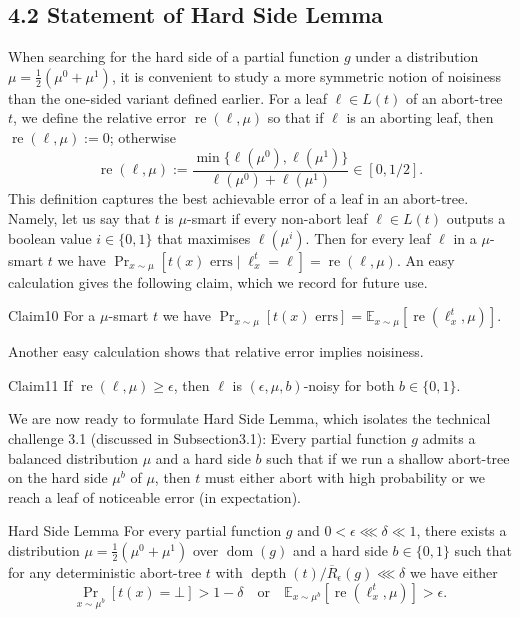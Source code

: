 \subsection*{4.2 Statement of Hard Side Lemma}
When searching for the hard side of a partial function $g$ under a distribution $\mu=\frac12(\mu^0+\mu^1)$, it is convenient to study a more symmetric notion of noisiness than the one-sided variant defined earlier. For a leaf $\ell\in L(t)$ of an abort-tree $t$, we define the relative error $\operatorname{re}(\ell,\mu)$ so that if $\ell$ is an aborting leaf, then $\operatorname{re}(\ell,\mu):=0$; otherwise
\[\operatorname{re}(\ell,\mu):=\frac{\min\{\ell(\mu^0),\ell(\mu^1)\}}{\ell(\mu^0)+\ell(\mu^1)}\in[0,1/2].\]
This definition captures the best achievable error of a leaf in an abort-tree. Namely, let us say that $t$ is $\mu$-smart if every non-abort leaf $\ell\in L(t)$ outputs a boolean value $i\in\{0,1\}$ that maximises $\ell(\mu^i)$. Then for every leaf $\ell$ in a $\mu$-smart $t$ we have $\Pr_{x\sim\mu}[t(x)\text{ errs}\mid\ell_x^t=\ell]=\operatorname{re}(\ell,\mu)$. An easy calculation gives the following claim, which we record for future use.
\begin{authorclaim}{Claim10}
For a $\mu$-smart $t$ we have $\Pr_{x\sim\mu}[t(x)\text{ errs}]=\mathbb E_{x\sim\mu}[\operatorname{re}(\ell_x^t,\mu)]$.
\end{authorclaim}
Another easy calculation shows that relative error implies noisiness.
\begin{authorclaim}{Claim11}
If $\operatorname{re}(\ell,\mu)\ge\epsilon$, then $\ell$ is $(\epsilon,\mu,b)$-noisy for both $b\in\{0,1\}$.
\end{authorclaim}
We are now ready to formulate Hard Side Lemma, which isolates the technical challenge 3.1 (discussed in Subsection3.1): Every partial function $g$ admits a balanced distribution $\mu$ and a hard side $b$ such that if we run a shallow abort-tree on the hard side $\mu^b$ of $\mu$, then $t$ must either abort with high probability or we reach a leaf of noticeable error (in expectation).
\begin{authorclaim}{Hard Side Lemma}
For every partial function $g$ and $0<\epsilon\lll\delta\ll1$, there exists a distribution $\mu=\frac12(\mu^0+\mu^1)$ over $\operatorname{dom}(g)$ and a hard side $b\in\{0,1\}$ such that for any deterministic abort-tree $t$ with $\operatorname{depth}(t)/\overline R_\epsilon(g)\lll\delta$ we have either
\begin{equation}\tag{3}\Pr_{x\sim\mu^b}[t(x)=\bot]>1-\delta\quad\text{or}\quad\mathbb E_{x\sim\mu^b}[\operatorname{re}(\ell_x^t,\mu)]>\epsilon.\end{equation}
\end{authorclaim}
